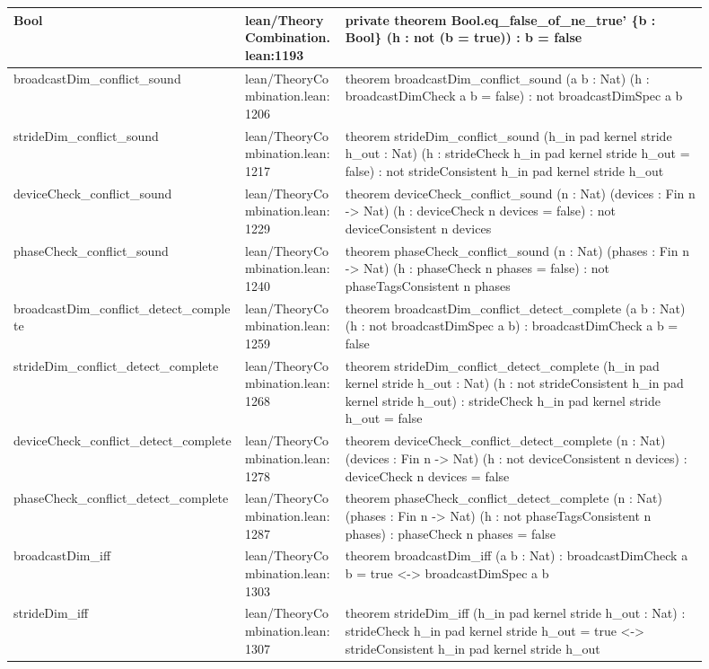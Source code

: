 \documentclass[10pt]{article}
\begin{document}
\begin{longtable}{|p{0.30\linewidth}|p{0.13\linewidth}|p{0.47\linewidth}|}
\hline
Bool & lean/TheoryCombination.lean:1193 & private theorem Bool.eq\_false\_of\_ne\_true' \{b : Bool\} (h : not (b = true)) : b = false \\
\hline
broadcastDim\_conflict\_sound & lean/TheoryCombination.lean:1206 & theorem broadcastDim\_conflict\_sound (a b : Nat) (h : broadcastDimCheck a b = false) : not broadcastDimSpec a b \\
\hline
strideDim\_conflict\_sound & lean/TheoryCombination.lean:1217 & theorem strideDim\_conflict\_sound (h\_in pad kernel stride h\_out : Nat) (h : strideCheck h\_in pad kernel stride h\_out = false) : not strideConsistent h\_in pad kernel stride h\_out \\
\hline
deviceCheck\_conflict\_sound & lean/TheoryCombination.lean:1229 & theorem deviceCheck\_conflict\_sound (n : Nat) (devices : Fin n -> Nat) (h : deviceCheck n devices = false) : not deviceConsistent n devices \\
\hline
phaseCheck\_conflict\_sound & lean/TheoryCombination.lean:1240 & theorem phaseCheck\_conflict\_sound (n : Nat) (phases : Fin n -> Nat) (h : phaseCheck n phases = false) : not phaseTagsConsistent n phases \\
\hline
broadcastDim\_conflict\_detect\_complete & lean/TheoryCombination.lean:1259 & theorem broadcastDim\_conflict\_detect\_complete (a b : Nat) (h : not broadcastDimSpec a b) : broadcastDimCheck a b = false \\
\hline
strideDim\_conflict\_detect\_complete & lean/TheoryCombination.lean:1268 & theorem strideDim\_conflict\_detect\_complete (h\_in pad kernel stride h\_out : Nat) (h : not strideConsistent h\_in pad kernel stride h\_out) : strideCheck h\_in pad kernel stride h\_out = false \\
\hline
deviceCheck\_conflict\_detect\_complete & lean/TheoryCombination.lean:1278 & theorem deviceCheck\_conflict\_detect\_complete (n : Nat) (devices : Fin n -> Nat) (h : not deviceConsistent n devices) : deviceCheck n devices = false \\
\hline
phaseCheck\_conflict\_detect\_complete & lean/TheoryCombination.lean:1287 & theorem phaseCheck\_conflict\_detect\_complete (n : Nat) (phases : Fin n -> Nat) (h : not phaseTagsConsistent n phases) : phaseCheck n phases = false \\
\hline
broadcastDim\_iff & lean/TheoryCombination.lean:1303 & theorem broadcastDim\_iff (a b : Nat) : broadcastDimCheck a b = true <-> broadcastDimSpec a b \\
\hline
strideDim\_iff & lean/TheoryCombination.lean:1307 & theorem strideDim\_iff (h\_in pad kernel stride h\_out : Nat) : strideCheck h\_in pad kernel stride h\_out = true <-> strideConsistent h\_in pad kernel stride h\_out \\

\end{longtable}
\end{document}
